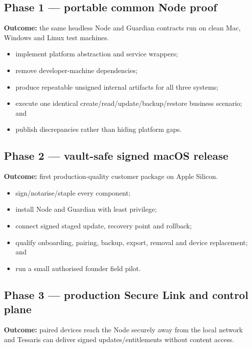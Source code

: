 \documentclass[11pt]{article}
\begin{document}
\subsection{Phase 1 --- portable common Node proof}

\textbf{Outcome:} the same headless Node and Guardian contracts run on clean Mac, Windows and Linux test machines.

\begin{itemize}
  \item implement platform abstraction and service wrappers;
  \item remove developer-machine dependencies;
  \item produce repeatable unsigned internal artifacts for all three systems;
  \item execute one identical create/read/update/backup/restore business scenario; and
  \item publish discrepancies rather than hiding platform gaps.
\end{itemize}

\subsection{Phase 2 --- vault-safe signed macOS release}

\textbf{Outcome:} first production-quality customer package on Apple Silicon.

\begin{itemize}
  \item sign/notarise/staple every component;
  \item install Node and Guardian with least privilege;
  \item connect signed staged update, recovery point and rollback;
  \item qualify onboarding, pairing, backup, export, removal and device replacement; and
  \item run a small authorised founder field pilot.
\end{itemize}

\subsection{Phase 3 --- production Secure Link and control plane}

\textbf{Outcome:} paired devices reach the Node securely away from the local network and Tessaris can deliver signed updates/entitlements without content access.
\end{document}
